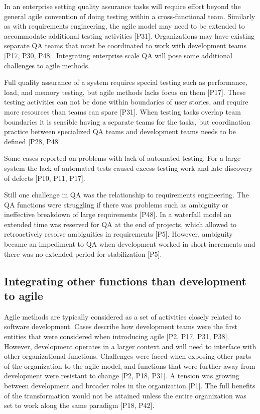 In an enterprise setting quality assurance tasks will require effort beyond the
general agile convention of doing testing within a cross-functional team.
Similarly as with requirements engineering, the agile model may need to be
extended to accommodate additional testing activities [P31]. Organizations may
have existing separate QA teams that must be coordinated to work with
development teams [P17, P30, P48]. Integrating enterprise scale QA will pose
some additional challenges to agile methods.

Full quality assurance of a system requires special testing such as performance,
load, and memory testing, but agile methods lacks focus on them [P17]. These
testing activities can not be done within boundaries of user stories, and
require more resources than teams can spare [P31]. When testing tasks overlap
team boundaries it is sensible having a separate teams for the tasks, but
coordination practice between specialized QA teams and development teams needs
to be defined [P28, P48].

Some cases reported on problems with lack of automated testing. For a large
system the lack of automated tests caused excess testing work and late discovery
of defects [P10, P11, P17].

Still one challenge in QA was the relationship to requirements engineering. The
QA functions were struggling if there was problems such as ambiguity or
ineffective breakdown of large requirements [P48]. In a waterfall model an
extended time was reserved for QA at the end of projects, which allowed to
retroactively resolve ambiguities in requirements [P5]. However, ambiguity
became an impediment to QA when development worked in short increments and
there was no extended period for stabilization [P5].


\subsection{Integrating other functions than development to agile}

Agile methods are typically considered as a set of activities closely related to
software development. Cases describe how development teams were the first
entities that were considered when introducing agile [P2, P17, P31, P38].
However, development operates in a larger context and will need to interface
with other organizational functions.
Challenges were faced when exposing other parts of the organization to the agile
model, and functions that were further away from development were resistant to
change [P2, P18, P31]. A tension was growing between development and broader
roles in the organization [P1]. The full benefits of the transformation would
not be attained unless the entire organization was set to work along the same
paradigm [P18, P42].

